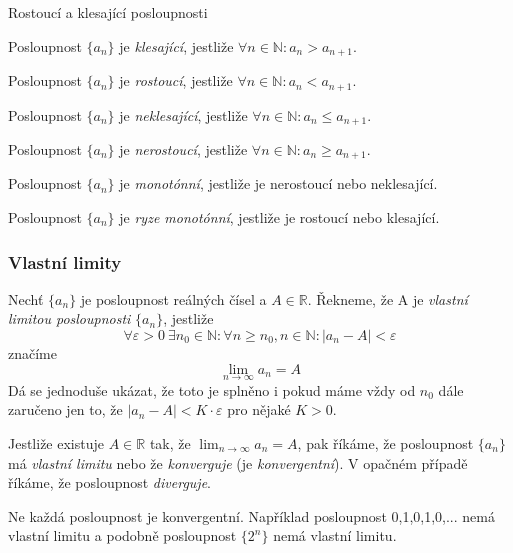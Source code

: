 \begin{definiceN}{Rostoucí a klesající posloupnosti}
\begin{penumerate}
	\item Posloupnost $\{a_n\}$ je \emph{klesající}, jestliže $\forall n \in \mathbb{N}: a_n > a_{n+1}$.
	\item Posloupnost $\{a_n\}$ je \emph{rostoucí}, jestliže $\forall n \in \mathbb{N}: a_n < a_{n+1}$.
	\item Posloupnost $\{a_n\}$ je \emph{neklesající}, jestliže $\forall n \in \mathbb{N}: a_n \le a_{n+1}$.
	\item Posloupnost $\{a_n\}$ je \emph{nerostoucí}, jestliže $\forall n \in \mathbb{N}: a_n \ge a_{n+1}$.
	\item Posloupnost $\{a_n\}$ je \emph{monotónní}, jestliže je nerostoucí nebo neklesající.
	\item Posloupnost $\{a_n\}$ je \emph{ryze monotónní}, jestliže je rostoucí nebo klesající.
\end{penumerate}
\end{definiceN}

\subsubsection{Vlastní limity}
\begin{definice}
Nechť $\{a_n\}$ je posloupnost reálných čísel a $A \in \mathbb{R}$. Řekneme, že A je \emph{vlastní limitou posloupnosti} $\{a_n\}$, jestliže
$$\forall \varepsilon > 0\ \exists n_0 \in \mathbb{N}: \forall n \ge n_0, n \in \mathbb{N}: |a_n - A| < \varepsilon$$
značíme
$$\lim_{n \rightarrow \infty} a_n = A$$
\noindent Dá se jednoduše ukázat, že toto je splněno i pokud máme vždy od $n_0$ dále zaručeno jen to, že $|a_n - A| < K\cdot\varepsilon$ pro nějaké $K>0$.
\end{definice}

\begin{definice}
Jestliže existuje $A \in \mathbb{R}$ tak, že $\lim_{n \rightarrow \infty}a_n = A$, pak říkáme, že posloupnost $\{a_n\}$ má \emph{vlastní limitu} nebo že \emph{konverguje} (je \emph{konvergentní}). V opačném případě říkáme, že posloupnost \emph{diverguje}.
\end{definice}

\begin{pozorovani}
Ne každá posloupnost je konvergentní. Například posloupnost 0,1,0,1,0,... nemá vlastní limitu a podobně posloupnost $\{2^n\}$ nemá vlastní limitu.
\end{pozorovani}

